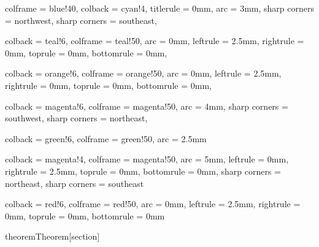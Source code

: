 
{
    colframe = blue!40,
    colback = cyan!4,
    titlerule = 0mm,
    arc = 3mm,
    sharp corners = northwest, 
    sharp corners = southeast,
}

{
    colback = teal!6,
    colframe = teal!50,
    arc = 0mm,
    leftrule = 2.5mm,
    rightrule = 0mm,
    toprule = 0mm,
    bottomrule = 0mm,
}

{
    colback = orange!6,
    colframe = orange!50,
    arc = 0mm,
    leftrule = 2.5mm,
    rightrule = 0mm,
    toprule = 0mm,
    bottomrule = 0mm,
}

{
    colback = magenta!6,
    colframe = magenta!50,
    arc = 4mm,
    sharp corners = southwest,
    sharp corners = northeast,
}

{
    colback = green!6,
    colframe = green!50,
    arc = 2.5mm
}

{
    colback = magenta!4,
    colframe = magenta!50,
    arc = 5mm,
    leftrule = 0mm,
    rightrule = 2.5mm,
    toprule = 0mm,
    bottomrule = 0mm,
    sharp corners = northeast,
    sharp corners = southeast
}

{
  colback = red!6,
  colframe = red!50,
  arc = 0mm,
  leftrule = 2.5mm,
  rightrule = 0mm,
  toprule = 0mm,
  bottomrule = 0mm
}

\newenvironment{soln}
{
    \vspace{0.1cm}
    \textit{Solution.}
}{$\hfill \blacksquare$}

\newenvironment{soln-container}
{
    \vspace{0.1cm}
}

\newtheorem{theorem}{Theorem}[section]
\newtheorem{corollary}{Corollary}[theorem]
\newtheorem{clm}[theorem]{Claim}

\theoremstyle{remark}
\newtheorem{examples}{Example}[theorem]

\theoremstyle{definition}
\newtheorem{prob}{Problem}
\newtheorem{definition}{Definition}[section]

